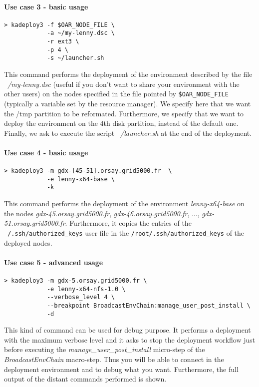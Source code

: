 \documentclass[a4wide,10pt,oneside]{book}
\begin{document}
\paragraph{Use case 3 - basic usage}
\begin{verbatim}
> kadeploy3 -f $OAR_NODE_FILE \
            -a ~/my-lenny.dsc \
            -r ext3 \
            -p 4 \
            -s ~/launcher.sh
\end{verbatim}
This command performs the deployment of the environment described by the file \textit{~/my-lenny.dsc} (useful if you don't want to share your environment with the other users) on the nodes specified in the file pointed by \texttt{\$OAR\_NODE\_FILE} (typically a variable set by the resource manager). We specify here that we want the /tmp partition to be reformated. Furthermore, we specify that we want to deploy the environment on the 4th disk partition, instead of the default one. Finally, we ask to execute the script \textit{~/launcher.sh} at the end of the deployment.

\paragraph{Use case 4 - basic usage}
\begin{verbatim}
> kadeploy3 -m gdx-[45-51].orsay.grid5000.fr  \
            -e lenny-x64-base \
            -k
\end{verbatim}
This command performs the deployment of the environment \textit{lenny-x64-base} on the nodes \textit{gdx-45.orsay.grid5000.fr}, \textit{gdx-46.orsay.grid5000.fr}, ..., \textit{gdx-51.orsay.grid5000.fr}. Furthermore, it copies the entries of the \texttt{~/.ssh/authorized\_keys} user file in the \texttt{/root/.ssh/authorized\_keys} of the deployed nodes.

\paragraph{Use case 5 - advanced usage}
\begin{verbatim}
> kadeploy3 -m gdx-5.orsay.grid5000.fr \
            -e lenny-x64-nfs-1.0 \
            --verbose_level 4 \
            --breakpoint BroadcastEnvChain:manage_user_post_install \
            -d
\end{verbatim}
This kind of command can be used for debug purpose. It performs a deployment with the maximum verbose level and it asks to stop the deployment workflow just before executing the \textit{manage\_user\_post\_install} micro-step of the \textit{BroadcastEnvChain} macro-step. Thus you will be able to connect in the deployment environment and to debug what you want. Furthermore, the full output of the distant commands performed is shown.
\end{document}
